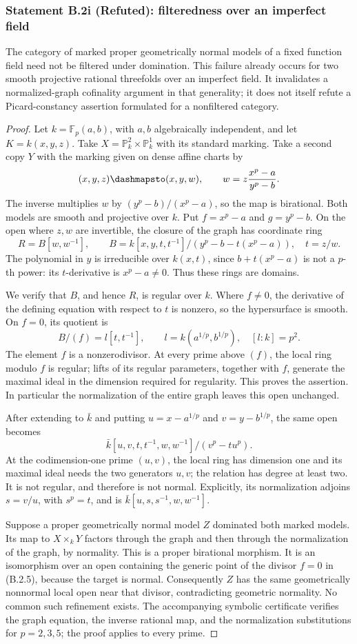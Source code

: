 \subsubsection*{Statement B.2i (Refuted): filteredness over an imperfect field}
The category of marked proper geometrically normal models of a fixed
function field need not be filtered under domination.  This failure
already occurs for two smooth projective rational threefolds over an
imperfect field.  It invalidates a normalized-graph cofinality argument
in that generality; it does not itself refute a Picard-constancy
assertion formulated for a nonfiltered category.
\begin{proof}
Let $k=\mathbb F_p(a,b)$, with $a,b$ algebraically independent, and
let $K=k(x,y,z)$.  Take $X=\mathbb P^2_k\times\mathbb P^1_k$ with
its standard marking.  Take a second copy $Y$ with the marking given
on dense affine charts by
\[
 (x,y,z)\dashmapsto (x,y,w),\qquad
 w=z\frac{x^p-a}{y^p-b}.
\]
The inverse multiplies $w$ by $(y^p-b)/(x^p-a)$, so the map is
birational.  Both models are smooth and projective over $k$.
Put $f=x^p-a$ and $g=y^p-b$.  On the open where $z,w$ are invertible,
the closure of the graph has coordinate ring
\[
 R=B[w,w^{-1}],\qquad
 B=k[x,y,t,t^{-1}]/(y^p-b-t(x^p-a)),\quad t=z/w.
 \tag{B.2.5}
\]
The polynomial in $y$ is irreducible over $k(x,t)$, since
$b+t(x^p-a)$ is not a $p$-th power: its $t$-derivative is $x^p-a\ne0$.
Thus these rings are domains.

We verify that $B$, and hence $R$, is regular over $k$.  Where
$f\ne0$, the derivative of the defining equation with respect to
$t$ is nonzero, so the hypersurface is smooth.  On $f=0$, its
quotient is
\[
 B/(f)=l[t,t^{-1}],\qquad l=k(a^{1/p},b^{1/p}),\quad [l:k]=p^2.
\]
The element $f$ is a nonzerodivisor.  At every prime above $(f)$,
the local ring modulo $f$ is regular; lifts of its regular parameters,
together with $f$, generate the maximal ideal in the dimension
required for regularity.  This proves the assertion.  In particular
the normalization of the entire graph leaves this open unchanged.

After extending to $\bar k$ and putting
$u=x-a^{1/p}$ and $v=y-b^{1/p}$, the same open becomes
\[
 \bar k[u,v,t,t^{-1},w,w^{-1}]/(v^p-tu^p).
\]
At the codimension-one prime $(u,v)$, the local ring has dimension
one and its maximal ideal needs the two generators $u,v$; the
relation has degree at least two.  It is not regular, and therefore
is not normal.  Explicitly, its normalization adjoins $s=v/u$, with
$s^p=t$, and is $\bar k[u,s,s^{-1},w,w^{-1}]$.

Suppose a proper geometrically normal model $Z$ dominated both
marked models.  Its map to $X\times_kY$ factors through the graph
and then through the normalization of the graph, by normality.
This is a proper birational morphism.  It is an isomorphism over
an open containing the generic point of the divisor $f=0$ in
(B.2.5), because the target is normal.  Consequently $Z$ has the
same geometrically nonnormal local open near that divisor,
contradicting geometric normality.  No common such refinement exists.
The accompanying symbolic certificate verifies the graph equation,
the inverse rational map, and the normalization substitutions for
$p=2,3,5$; the proof applies to every prime.
\end{proof}
